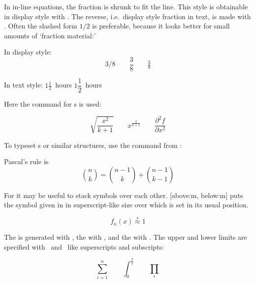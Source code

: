 In in-line equations, the fraction is shrunk to
fit the line. This style is obtainable in display style with . The
reverse, i.e.\ display style fraction in text, is made with .
Often the slashed form $1/2$ is preferable, because it looks better
for small amounts of `fraction material:'
\begin{example}
In display style:
\begin{equation*}
  3/8 \qquad \frac{3}{8} 
  \qquad \tfrac{3}{8}
\end{equation*}
\end{example}

\begin{example}
In text style:
$1\frac{1}{2}$~hours \qquad
$1\dfrac{1}{2}$~hours
\end{example}

Here the  command for s is used:
\begin{example}
\begin{equation*} 
  \sqrt{\frac{x^2}{k+1}}\qquad
  x^\frac{2}{k+1}\qquad
  \frac{\partial^2f}
  {\partial x^2} 
\end{equation*}
\end{example}

To typeset s or similar structures, use
the command  from :
\begin{example}
Pascal's rule is
\begin{equation*}
 \binom{n}{k} =\binom{n-1}{k}
 + \binom{n-1}{k-1}
\end{equation*}
\end{example}

For  it may be useful to stack symbols over each other.
[above:m, below:m] puts the symbol given%
in  in superscript-like size over  which
is set in its usual position.
\begin{example}
\begin{equation*}
 f_n(x) \stackrel{*}{\approx} 1
\end{equation*}
\end{example}

The \emph{} is generated with , the
\emph{} with , and the \emph{}
with . The upper and lower limits are specified with~\ai{\^{}}
and~\ai{\_} like superscripts and subscripts:
\begin{example}
\begin{equation*}
\sum_{i=1}^n \qquad
\int_0^{\frac{\pi}{2}} \qquad
\prod_\epsilon
\end{equation*}
\end{example}

